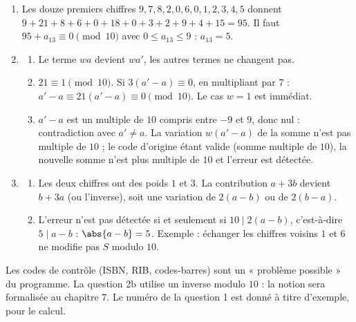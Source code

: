 \begin{solution}[Problème]
\begin{enumerate}
\item Les douze premiers chiffres $9,7,8,2,0,6,0,1,2,3,4,5$ donnent $9+21+8+6+0+18+0+3+2+9+4+15=95$. Il faut $95+a_{13}\equiv0\pmod{10}$ avec $0\le a_{13}\le9$ : $a_{13}=5$.
\item
\begin{enumerate}
\item Le terme $wa$ devient $wa'$, les autres termes ne changent pas.
\item $21\equiv1\pmod{10}$. Si $3(a'-a)\equiv0$, en multipliant par $7$ : $a'-a\equiv21(a'-a)\equiv0\pmod{10}$. Le cas $w=1$ est immédiat.
\item $a'-a$ est un multiple de $10$ compris entre $-9$ et $9$, donc nul : contradiction avec $a'\neq a$. La variation $w(a'-a)$ de la somme n'est pas multiple de $10$ ; le code d'origine étant valide (somme multiple de $10$), la nouvelle somme n'est plus multiple de $10$ et l'erreur est détectée.
\end{enumerate}
\item
\begin{enumerate}
\item Les deux chiffres ont des poids $1$ et $3$. La contribution $a+3b$ devient $b+3a$ (ou l'inverse), soit une variation de $2(a-b)$ ou de $2(b-a)$.
\item L'erreur n'est pas détectée si et seulement si $10\mid2(a-b)$, c'est-à-dire $5\mid a-b$ : $\abs{a-b}=5$. Exemple : échanger les chiffres voisins $1$ et $6$ ne modifie pas $S$ modulo $10$.
\end{enumerate}
\end{enumerate}
\end{solution}
\begin{teachernote}
Les codes de contrôle (ISBN, RIB, codes-barres) sont un « problème possible » du programme. La question 2b utilise un inverse modulo $10$ : la notion sera formalisée au chapitre 7. Le numéro de la question 1 est donné à titre d'exemple, pour le calcul.
\end{teachernote}
